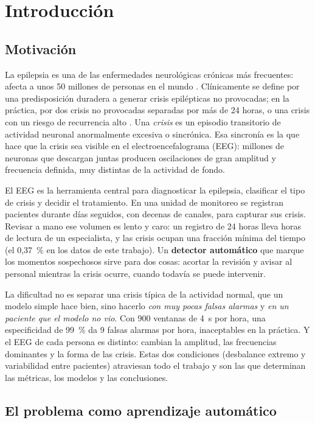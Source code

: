 \chapter{Introducción}
\label{cap:introduccion}

\section{Motivación}

La epilepsia es una de las enfermedades neurológicas crónicas más frecuentes: afecta a unos 50 millones de personas en
el mundo \parencite{who2024}. Clínicamente se define por una predisposición duradera a generar crisis epilépticas no
provocadas; en la práctica, por dos crisis no provocadas separadas por más de 24 horas, o una crisis con un riesgo de
recurrencia alto \parencite{fisher2014}. Una \emph{crisis} es un episodio transitorio de actividad neuronal anormalmente
excesiva o sincrónica. Esa sincronía es la que hace que la crisis sea visible en el electroencefalograma (EEG): millones
de neuronas que descargan juntas producen oscilaciones de gran amplitud y frecuencia definida, muy distintas de la
actividad de fondo.

El EEG es la herramienta central para diagnosticar la epilepsia, clasificar el tipo de crisis y decidir el tratamiento.
En una unidad de monitoreo se registran pacientes durante días seguidos, con decenas de canales, para capturar sus crisis.
Revisar a mano ese volumen es lento y caro: un registro de 24 horas lleva horas de lectura de un especialista, y las
crisis ocupan una fracción mínima del tiempo (el 0,37~\% en los datos de este trabajo). Un \textbf{detector automático}
que marque los momentos sospechosos sirve para dos cosas: acortar la revisión y avisar al personal mientras la crisis
ocurre, cuando todavía se puede intervenir.

La dificultad no es separar una crisis típica de la actividad normal, que un modelo simple hace bien, sino hacerlo
\emph{con muy pocas falsas alarmas} y \emph{en un paciente que el modelo no vio}. Con 900 ventanas de 4~s por hora, una
especificidad de 99~\% da 9 falsas alarmas por hora, inaceptables en la práctica. Y el EEG de cada persona es distinto:
cambian la amplitud, las frecuencias dominantes y la forma de las crisis. Estas dos condiciones (desbalance extremo y
variabilidad entre pacientes) atraviesan todo el trabajo y son las que determinan las métricas, los modelos y las
conclusiones.

\section{El problema como aprendizaje automático}


